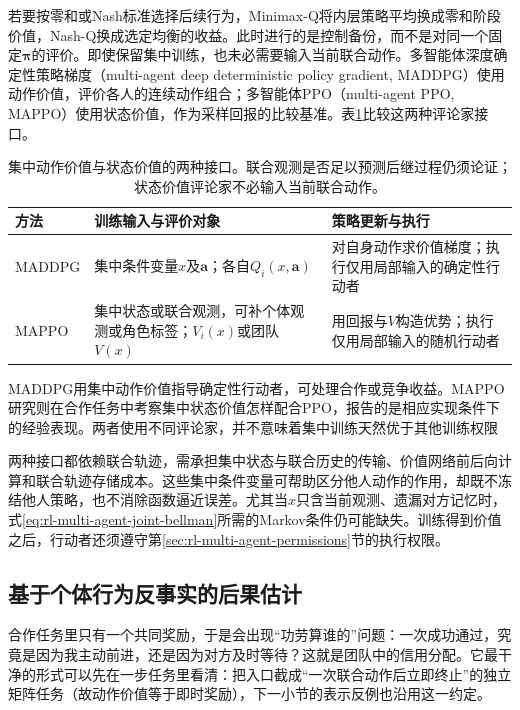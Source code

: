 若要按零和或Nash标准选择后续行为，Minimax-Q将内层策略平均换成零和阶段价值，Nash-Q换成选定均衡的收益。此时进行的是控制备份，而不是对同一个固定$\bm\pi$的评价。即使保留集中训练，也未必需要输入当前联合动作。多智能体深度确定性策略梯度（multi-agent deep deterministic policy gradient, MADDPG）使用动作价值，评价各人的连续动作组合；多智能体PPO（multi-agent PPO, MAPPO）使用状态价值，作为采样回报的比较基准。表\ref{tab:rl-multi-agent-critics}比较这两种评论家接口。

\begin{table}[htbp]
 \centering
 \begin{tabularx}{\linewidth}{@{}l >{\raggedright\arraybackslash}X >{\raggedright\arraybackslash}X@{}}
 \toprule
 方法 & 训练输入与评价对象 & 策略更新与执行\\
 \midrule
 MADDPG & 集中条件变量$x$及$\bm a$；各自$Q_i(x,\bm a)$ & 对自身动作求价值梯度；执行仅用局部输入的确定性行动者\\
 MAPPO & 集中状态或联合观测，可补个体观测或角色标签；$V_i(x)$或团队$V(x)$ & 用回报与$V$构造优势；执行仅用局部输入的随机行动者\\
 \bottomrule
 \end{tabularx}
 \caption{集中动作价值与状态价值的两种接口。联合观测是否足以预测后继过程仍须论证；状态价值评论家不必输入当前联合动作。}
 \label{tab:rl-multi-agent-critics}
\end{table}

MADDPG用集中动作价值指导确定性行动者，可处理合作或竞争收益。MAPPO研究则在合作任务中考察集中状态价值怎样配合PPO，报告的是相应实现条件下的经验表现。两者使用不同评论家，并不意味着集中训练天然优于其他训练权限

两种接口都依赖联合轨迹，需承担集中状态与联合历史的传输、价值网络前后向计算和联合轨迹存储成本。这些集中条件变量可帮助区分他人动作的作用，却既不冻结他人策略，也不消除函数逼近误差。尤其当$x$只含当前观测、遗漏对方记忆时，式\eqref{eq:rl-multi-agent-joint-bellman}所需的Markov条件仍可能缺失。训练得到价值之后，行动者还须遵守第\ref{sec:rl-multi-agent-permissions}节的执行权限。

\subsection{基于个体行为反事实的后果估计}
\label{sec:rl-multi-agent-counterfactual}

合作任务里只有一个共同奖励，于是会出现“功劳算谁的”问题：一次成功通过，究竟是因为我主动前进，还是因为对方及时等待？这就是团队中的信用分配。它最干净的形式可以先在一步任务里看清：把入口截成“一次联合动作后立即终止”的独立矩阵任务（故动作价值等于即时奖励），下一小节的表示反例也沿用这一约定。

